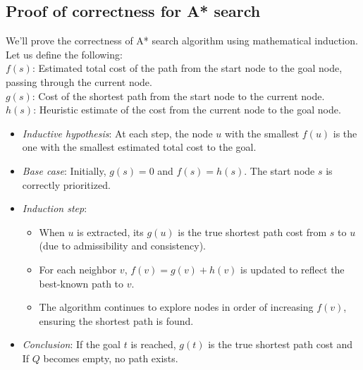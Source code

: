 \begin{appendices}
\section{Proof of correctness for A* search}\label{appendix:astar:correctness}
	We'll prove the correctness of A* search algorithm using mathematical induction. Let us define the following: \\
	$f(s)$: Estimated total cost of the path from the start node to the goal node, passing through the current node. \\
	$g(s)$: Cost of the shortest path from the start node to the current node. \\
	$h(s)$: Heuristic estimate of the cost from the current node to the goal node.
	\begin{itemize}
		\item \textit{Inductive hypothesis}: At each step, the node $u$ with the smallest $f(u)$ is the one with the smallest estimated total cost to the goal.
		\item \textit{Base case}: Initially, $g(s)=0$ and $f(s)=h(s)$. The start node $s$ is correctly prioritized.
		\item \textit{Induction step}: 
			\begin{itemize}
				\item When $u$ is extracted, its $g(u)$ is the true shortest path cost from $s$ to $u$ (due to admissibility and consistency).
				\item For each neighbor $v$, $f(v)=g(v)+h(v)$ is updated to reflect the best-known path to $v$.
				\item The algorithm continues to explore nodes in order of increasing $f(v)$, ensuring the shortest path is found.
			\end{itemize}
		\item \textit{Conclusion}: If the goal $t$ is reached, $g(t)$ is the true shortest path cost and If $Q$ becomes empty, no path exists.
	\end{itemize}

\end{appendices}
